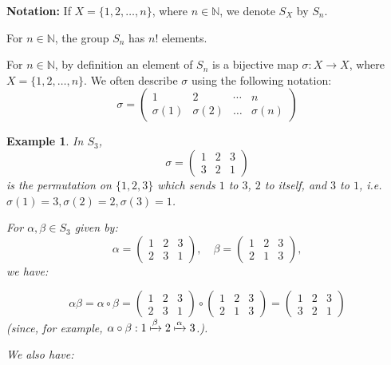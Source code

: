 \documentclass[a4paper,12pt]{report}
\newcommand{\ra}{\longrightarrow}
\newcounter{statement}
\numberwithin{statement}{chapter}
\newtheorem{eg}[statement]{\bf Example}
\numberwithin{equation}{chapter}
\numberwithin{section}{chapter}
\numberwithin{subsection}{section}
\begin{document}
 {\bf Notation:} 
If $X = \{1, 2, \ldots, n\}$, where $n \in \mathbb{N}$,
we denote $S_X$ by $S_n$.



For $n \in \mathbb{N}$, the group $S_n$ has $n!$ elements.



For $n \in \mathbb{N}$,
by definition an element of $S_n$ is a bijective map $\sigma : X \ra X$,
where $X = \{1, 2, \ldots, n\}$.
We often describe $\sigma$ using the following notation:
\[
\sigma = \left(\begin{matrix}
1 & 2 & \cdots & n\\
\sigma(1) & \sigma(2) & \ldots & \sigma(n)
\end{matrix}
\right)
\]

\begin{eg}
In $S_3$,
\[
\sigma = \left(
\begin{matrix}
1 & 2 & 3\\
3 & 2 & 1
\end{matrix}
\right)
\]
is the permutation on $\{1, 2, 3\}$
which sends $1$ to $3$, $2$ to itself, and $3$ to $1$,
i.e. $\sigma(1) = 3, \sigma(2) = 2, \sigma(3) = 1$.




For $\alpha, \beta \in S_3$ given by:
\[
\alpha =
\left(
\begin{matrix}
1 & 2 & 3\\
2 & 3 & 1
\end{matrix}\right),
\quad
\beta =
\left(\begin{matrix}
1 & 2 & 3\\
2 & 1 & 3
\end{matrix}\right),
\]
we have:




\[
\alpha\beta = \alpha\circ\beta
=
\left(\begin{matrix}
1 & 2 & 3\\
2 & 3 & 1
\end{matrix}\right) \circ
\left(\begin{matrix}
1 & 2 & 3\\
2 & 1 & 3
\end{matrix}\right)
=\left(\begin{matrix}
1 & 2 & 3\\
3 & 2 & 1
\end{matrix}\right)
\]
(since, for example, $\alpha\circ\beta: 1 \xmapsto{\beta} 2 \xmapsto{\alpha} 3$.).



We also have:





\end{eg}
\end{document}
